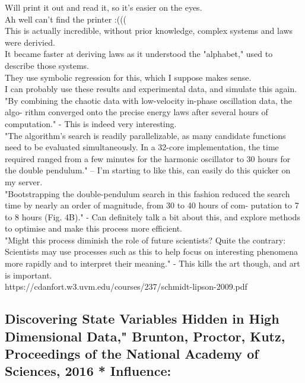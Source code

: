 \documentclass [12pt]{article}
\begin{document}
Will print it out and read it, so it's easier on the eyes.\\ 

Ah well can't find the printer :(((\\

This is actually incredible, without prior knowledge, complex systems and laws were derivied.\\ 

It became faster at deriving laws as it understood the "alphabet," used to describe those systems.\\ 


They use symbolic regression for this, which I suppose makes sense. \\ 

I can probably use these results and experimental data, and simulate this again. \\

"By combining the chaotic data with
low-velocity in-phase oscillation data, the algo-
rithm converged onto the precise energy laws
after several hours of computation." - This is indeed very interesting.\\ 

"The algorithm’s search is readily parallelizable,
as many candidate functions need to be evaluated
simultaneously. In a 32-core implementation, the
time required ranged from a few minutes for the
harmonic oscillator to 30 hours for the double
pendulum." -- I'm starting to like this, can easily do this quicker on my server.\\ 

"Bootstrapping the double-pendulum search in
this fashion reduced the search time by nearly an
order of magnitude, from 30 to 40 hours of com-
putation to 7 to 8 hours (Fig. 4B)." - Can definitely talk a bit about this, and explore methods to optimise and make this process more efficient.\\ 

"Might this process diminish the role of future
scientists? Quite the contrary: Scientists may use
processes such as this to help focus on interesting
phenomena more rapidly and to interpret their
meaning." - This kills the art though, and art is important.\\ 

https://cdanfort.w3.uvm.edu/courses/237/schmidt-lipson-2009.pdf\\

\subsection{Discovering State Variables Hidden in High Dimensional Data," Brunton, Proctor, Kutz, Proceedings of the National Academy of Sciences, 2016
* Influence: }
\end{document}
